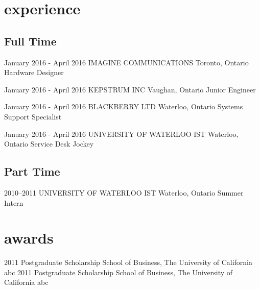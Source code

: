 \documentclass[hidelinks]{kkurucz-cv}
\begin{document}

\section{experience}

\subsection{Full Time}

\begin{entrylist}
\entry
{January 2016 - April 2016}
{IMAGINE COMMUNICATIONS}
{Toronto, Ontario}
{Hardware Designer}
{\null}

\entry
{January 2016 - April 2016}
{KEPSTRUM INC}
{Vaughan, Ontario}
{Junior Engineer}
{\null}

\entry
{January 2016 - April 2016}
{BLACKBERRY LTD}
{Waterloo, Ontario}
{Systems Support Specialist}
{\null}

\entry
{January 2016 - April 2016}
{UNIVERSITY OF WATERLOO IST}
{Waterloo, Ontario}
{Service Desk Jockey}
{\null}
\end{entrylist}

\subsection{Part Time}

\begin{entrylist}
\entry
{2010--2011}
{UNIVERSITY OF WATERLOO IST}
{Waterloo, Ontario}
{Summer Intern}
{\null}
\end{entrylist}


\section{awards}

\begin{entrylist}
\entry
{2011}
{Postgraduate Scholarship}
{School of Business, The University of California}
{abc}
{\null}
\entry
{2011}
{Postgraduate Scholarship}
{School of Business, The University of California}
{abc}
{\null}
\end{entrylist}
\end{document}
